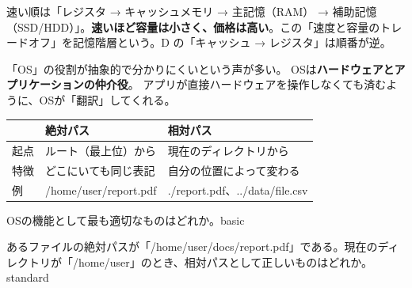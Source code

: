 
\begin{trickwarn}
速い順は「レジスタ → キャッシュメモリ → 主記憶（RAM） → 補助記憶（SSD/HDD）」。\textbf{速いほど容量は小さく、価格は高い}。この「速度と容量のトレードオフ」を記憶階層という。D の「キャッシュ → レジスタ」は順番が逆。
\end{trickwarn}





\mondaipage
{}

\begin{stumble}
「OS」の役割が抽象的で分かりにくいという声が多い。
OSは\textbf{ハードウェアとアプリケーションの仲介役}。
アプリが直接ハードウェアを操作しなくても済むように、OSが「翻訳」してくれる。
\end{stumble}

\begin{comparison}
\begin{tabularx}{\textwidth}{lXX}
  \toprule
  & \textbf{絶対パス} & \textbf{相対パス} \\
  \midrule
  起点 & ルート（最上位）から & 現在のディレクトリから \\
  特徴 & どこにいても同じ表記 & 自分の位置によって変わる \\
  例 & /home/user/report.pdf & ./report.pdf、../data/file.csv \\
  \bottomrule
\end{tabularx}
\end{comparison}


\begin{mondai}{OSの機能として最も適切なものはどれか。}{basic}
\end{mondai}

\begin{mondai}{あるファイルの絶対パスが「/home/user/docs/report.pdf」である。現在のディレクトリが「/home/user」のとき、相対パスとして正しいものはどれか。}{standard}
\end{mondai}

